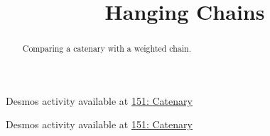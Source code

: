 \documentclass{ximera}
\title{Hanging Chains}
\begin{document}
\begin{abstract}
Comparing a catenary with a weighted chain.
\end{abstract}
\maketitle


\begin{question}  \label{Q:LMMN89}

\begin{onlineOnly}
    \begin{center}
\end{center}
\end{onlineOnly}

Desmos activity available at \href{https://www.desmos.com/calculator/d6yyz2cvte}{151: Catenary}


\end{question}


\begin{question}  \label{Q:DFDFGGtg}

\begin{onlineOnly}
    \begin{center}
\end{center}
\end{onlineOnly}

Desmos activity available at \href{https://www.desmos.com/calculator/sv70z21j2j}{151: Catenary}

\end{question}
\end{document}
